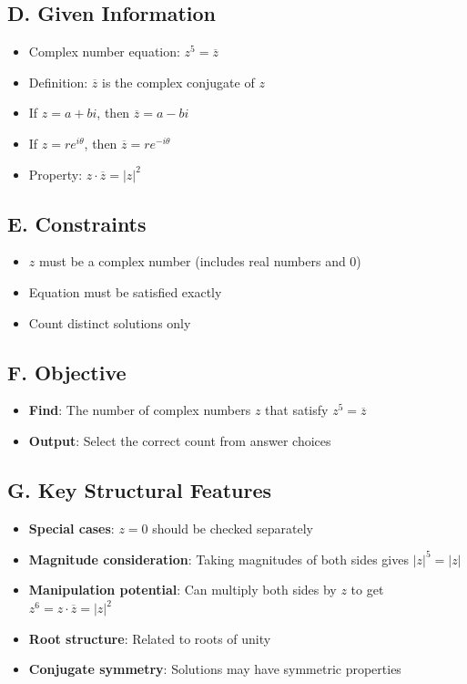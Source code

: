 \documentclass[11pt]{article}
\begin{document}
\begin{problembox}
\subsection*{D. Given Information}
\begin{itemize}[leftmargin=*]
    \item Complex number equation: $z^5 = \overline{z}$
    \item Definition: $\overline{z}$ is the complex conjugate of $z$
    \item If $z = a + bi$, then $\overline{z} = a - bi$
    \item If $z = re^{i\theta}$, then $\overline{z} = re^{-i\theta}$
    \item Property: $z \cdot \overline{z} = |z|^2$
\end{itemize}

\subsection*{E. Constraints}
\begin{itemize}[leftmargin=*]
    \item $z$ must be a complex number (includes real numbers and 0)
    \item Equation must be satisfied exactly
    \item Count distinct solutions only
\end{itemize}

\subsection*{F. Objective}
\begin{itemize}[leftmargin=*]
    \item \textbf{Find}: The number of complex numbers $z$ that satisfy $z^5 = \overline{z}$
    \item \textbf{Output}: Select the correct count from answer choices
\end{itemize}

\subsection*{G. Key Structural Features}
\begin{itemize}[leftmargin=*]
    \item \textbf{Special cases}: $z = 0$ should be checked separately
    \item \textbf{Magnitude consideration}: Taking magnitudes of both sides gives $|z|^5 = |z|$
    \item \textbf{Manipulation potential}: Can multiply both sides by $z$ to get $z^6 = z \cdot \overline{z} = |z|^2$
    \item \textbf{Root structure}: Related to roots of unity
    \item \textbf{Conjugate symmetry}: Solutions may have symmetric properties
\end{itemize}


\end{problembox}
\end{document}
